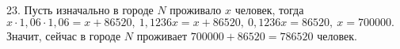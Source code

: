 23. Пусть изначально в городе $N$ проживало $x$ человек, тогда $x\cdot1,06\cdot1,06=x+86520,\ 1,1236x=x+86520,\ 0,1236x=86520,\ x=700000.$ Значит, сейчас в городе $N$ проживает $700000+86520=786520$ человек.\\
